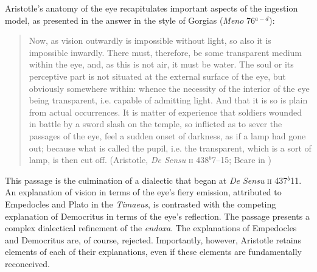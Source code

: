 Aristotle's anatomy of the eye recapitulates important aspects of the ingestion model, as presented in the answer in the style of Gorgias (\emph{Meno} 76\( ^{a-d} \)):
\begin{quote}
	Now, as vision outwardly is impossible without light, so also it is impossible inwardly. There must, therefore, be some transparent medium within the eye, and, as this is not air, it must be water. The soul or its perceptive part is not situated at the external surface of the eye, but obviously somewhere within: whence the necessity of the interior of the eye being transparent, i.e. capable of admitting light. And that it is so is plain from actual occurrences. It is matter of experience that soldiers wounded in battle by a sword slash on the temple, so inflicted as to sever the passages of the eye, feel a sudden onset of darkness, as if a lamp had gone out; because what is called the pupil, i.e. the transparent, which is a sort of lamp, is then cut off. (Aristotle, \emph{De Sensu} \textsc{ii} 438\( ^{b} \)7--15; Beare in \citealt[6]{Barnes:1984uq})
\end{quote}
This passage is the culmination of a dialectic that began at \emph{De Sensu} \textsc{ii} 437\( ^{b} \)11. An explanation of vision in terms of the eye's fiery emission, attributed to Empedocles and Plato in the \emph{Timaeus}, is contrasted with the competing explanation of Democritus in terms of the eye's reflection. The passage presents a complex dialectical refinement of the \emph{endoxa}. The explanations of Empedocles and Democritus are, of course, rejected. Importantly, however, Aristotle retains elements of each of their explanations, even if these elements are fundamentally reconceived.

